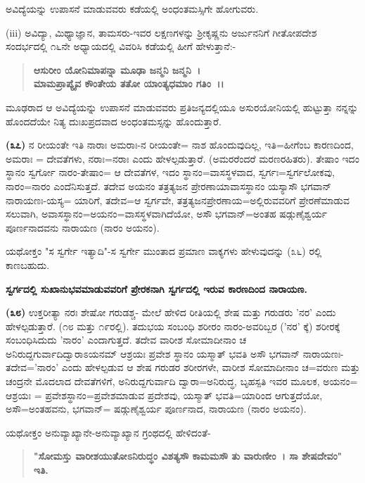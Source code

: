 ಅವಿದ್ಯೆಯನ್ನು ಉಪಾಸನೆ ಮಾಡುವವರು ಕಡೆಯಲ್ಲಿ ಅಂಧಂತಮಸ್ಸಿಗೇ ಹೋಗುವರು.

(iii) ಅವಿದ್ಯಾ, ಮಿಥ್ಯಾಜ್ಞಾನ, ತಾಮಸರು-ಇವರ ಲಕ್ಷಣಗಳನ್ನು ಶ‍್ರೀಕೃಷ್ಣನು ಅರ್ಜುನನಿಗೆ ಗೀತೋಪದೇಶ ಸಂದರ್ಭದಲ್ಲಿ ೧೬ನೇ ಅಧ್ಯಾಯದಲ್ಲಿ ವಿವರಿಸಿ ಕಡೆಯಲ್ಲಿ ಹೀಗೆ ಹೇಳುತ್ತಾನೆ:-

\begin{verse}
\textbf{ಆಸುರೀಂ ಯೋನಿಮಾಪನ್ನಾ ಮೂಢಾ ಜನ್ಮನಿ ಜನ್ಮನಿ~।}\\\textbf{ಮಾಮಪ್ರಾಪ್ಯೈವ ಕೌಂತೇಯ ತತೋ ಯಾಂತ್ಯಧಮಾಂ ಗತಿಂ~।।}
\end{verse}

\noindent
ಮೂಢರಾದ ಆ ಅವಿದ್ಯೆಯನ್ನು ಉಪಾಸನೆ ಮಾಡುವವರು ಪ್ರತಿಜನ್ಯದಲ್ಲಿಯೂ ಅಸುರಯೋನಿಯಲ್ಲಿ ಹುಟ್ಟುತ್ತಾ ನನ್ನನ್ನು ಹೊಂದದೆಯೇ ನಿತ್ಯ ದುಃಖಪ್ರದವಾದ ಅಂಧಂತಮಸ್ಸನ್ನು ಹೊಂದುತ್ತಾರೆ.

\textbf{(೩೭)} ನ ರೀಯಂತೇ ಇತಿ ನಾರಾಃ ಅಮರಾಃ-ನ ರೀಯಂತೇ= ನಾಶ ಹೊಂದುವುದಿಲ್ಲ, ಇತಿ=ಹೀಗೆಂಬ ಕಾರಣದಿಂದ, ಅಮರಾಃ = ದೇವತೆಗಳು, ನರಾಃ=ನರಾಃ ಎಂದು ಹೇಳಲ್ಪಡುತ್ತಾರೆ. (ಅಮರರೆಂದರೆ ಮರಣರಹಿತರು). ತೇಷಾಂ ಇದಂ ಸ್ಥಾನಂ ಸ್ವರ್ಗೋ ನಾರಂ-ತೇಷಾಂ= ಆ ದೇವತೆಗಳ, ಇದಂ ಸ್ಥಾನಂ=ವಾಸಸ್ಥಳವಾದ, ಸ್ವರ್ಗಃ=ಸ್ವರ್ಗಲೋಕವು, ನಾರಂ=ನಾರಂ ಎಂದೆನಿಸುತ್ತದೆ. ತದೇವ ಅಯನಂ ತತ್ರತ್ಯಜನ ಪ್ರೇರಣಾಯಾವಾಸಸ್ಥಾನಂ ಯಸ್ಯಾಸೌ ಭಗವಾನ್ ನಾರಾಯಣಃ-ಯಸ್ಯ= ಯಾರಿಗೆ, ತದೇವ=ಆ ಸ್ವರ್ಗವೇ, ತತ್ರತ್ಯಜನ\-ಪ್ರೇರಣಾಯ=ಅಲ್ಲಿರುವವರಿಗೆ ಪ್ರೇರಣೆಮಾಡುವ ಸಲುವಾಗಿ, ಅವಾಸಸ್ಥಾನಂ=ಅಯನಂ=\break ವಾಸಸ್ಥಳವಾಗಿದೆಯೋ, ಅಸೌ ಭಗವಾನ್=ಅಂತಹ ಷಡ್ಗುಣೈಶ್ವರ್ಯ ಪೂರ್ಣನಾದವನು ನಾರಾಯಣ (ನಾರಂ ಅಯನಂ).

ಯಥೋಕ್ತಂ "ಸ ಸ್ವರ್ಗೇ ಇತ್ಯಾದಿ"-ಸ ಸ್ವರ್ಗೇ ಮುಂತಾದ ಪ್ರಮಾಣ ವಾಕ್ಯಗಳು ಹೇಳುವುದನ್ನು (೩೬) ರಲ್ಲಿ ಕಾಣಬಹುದು.

\begin{center}
\textbf{ಸ್ವರ್ಗದಲ್ಲಿ ಸುಖಾನುಭವಮಾಡುವವರಿಗೆ ಪ್ರೇರಕನಾಗಿ ಸ್ವರ್ಗದಲ್ಲಿ ಇರುವ ಕಾರಣದಿಂದ ನಾರಾಯಣ.}
\end{center}

\textbf{(೩೮)} ಉಕ್ತರೀತ್ಯಾ ನರಃ ಶೇಷೋ ಗರುಡಶ್ಚ- ಮೇಲೆ ಹೇಳಿದ ರೀತಿಯಲ್ಲಿ ಶೇಷ ಮತ್ತು ಗರುಡರು 'ನರ' ಎಂದು ಹೇಳಲ್ಪಡುತ್ತಾರೆ. (೧೮ ಮತ್ತು ೧೯ರಲ್ಲಿ). ತದುಭಯ ಸಂಬಂಧಿ ಶರೀರಂ ನಾರಂ-ಅವರಿಬ್ಬರ ('ನರ' ಕ್ಕೆ) ಶರೀರಕ್ಕೆ ಸಂಬಂಧಿಸಿದುದು 'ನಾರಂ' ಎಂದಾಗುತ್ತದೆ. ತದೇವ ವಾರೀಶ ಸೋಮಾದೀನಾಂ ಚ ಅನಿರುದ್ದಗುರ್ವಾದಿದ್ವಾರಾಽಯನಮ್ ಆಶ್ರಯಃ ಪ್ರವೇಶ ಸ್ಥಾನಂ ಯಸ್ಮಾತ್ ಭವತಿ ಅಸೌ ಭಗವಾನ್ ನಾರಾಯಣಃ-ತದೇವ='ನಾರಂ' ಎಂದು ಹೇಳಲ್ಪಡುವ ಆ ಶೇಷ ಗರುಡರ ಶರೀರಗಳೇ, ವಾರೀಶ ಸೋಮಾದೀನಾಂ ಚ=ವರುಣ ಮತ್ತು ಚಂದ್ರನೇ ಮೊದಲಾದ ದೇವತೆಗಳಿಗೆ, ಅನಿರುದ್ದಗುರ್ವಾದಿ ದ್ವಾರಾ=ಅನಿರುದ್ಧ, ಬೃಹಸ್ಪತಿ ಇವರ ಮೂಲಕ, ಅಯನಂ= ಆಶ್ರಯಃ = ಪ್ರವೇಶಸ್ಥಾನಂ=ಪ್ರವೇಶಮಾಡುವ ಪ್ರದೇಶವು, ಯಸ್ಮಾತ್ ಭವತಿ=ಯಾರಿಂದ ಆಗುತ್ತದೆಯೋ, ಅಸೌ=ಅಂತಹವನು, ಭಗವಾನ್\-= ಷಡ್ಗುಣೈಶ್ವರ್ಯ ಪೂರ್ಣನಾದ, ನಾರಾಯಣ (ನಾರಂ ಅಯನಂ).

ಯಥೋಕ್ತಂ ಅನುವ್ಯಾಖ್ಯಾನೇ-ಅನುವ್ಯಾಖ್ಯಾನ ಗ್ರಂಥದಲ್ಲಿ ಹೇಳಿದಂತೆ-

\begin{verse}
\textbf{"ಸೋಮಸ್ತು ವಾರೀಶಯುತೋಽನಿರುದ್ಧಂ ವಿಶತ್ಯಸೌ ಕಾಮಮಸೌ ತು ವಾರುಣೀಂ~। ಸಾ ಶೇಷದೇವಂ" ಇತಿ.}
\end{verse}

